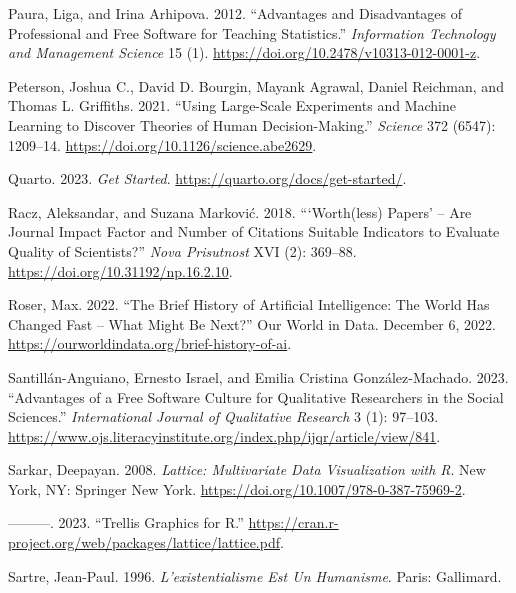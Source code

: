 \documentclass[
  letterpaper,
]{scrbook}
\newlength{\cslhangindent}
\newlength{\cslentryspacingunit} %
\newenvironment{CSLReferences}[2] %
 {%
  \setlength{\parindent}{0pt}
  \ifodd #1
  \let\oldpar\par
  \def\par{\hangindent=\cslhangindent\oldpar}
  \fi
  \setlength{\parskip}{#2\cslentryspacingunit}
 }%
 {}
\begin{document}
\begin{CSLReferences}{1}{0}
\leavevmode{}%
Paura, Liga, and Irina Arhipova. 2012. {``Advantages and {Disadvantages}
of {Professional} and {Free Software} for {Teaching Statistics}.''}
\emph{Information Technology and Management Science} 15 (1).
\url{https://doi.org/10.2478/v10313-012-0001-z}.

\leavevmode{}%
Peterson, Joshua C., David D. Bourgin, Mayank Agrawal, Daniel Reichman,
and Thomas L. Griffiths. 2021. {``Using {Large-Scale Experiments} and
{Machine Learning} to {Discover Theories} of {Human Decision-Making}.''}
\emph{Science} 372 (6547): 1209--14.
\url{https://doi.org/10.1126/science.abe2629}.

\leavevmode{}%
Quarto. 2023. \emph{Get {Started}}.
\url{https://quarto.org/docs/get-started/}.

\leavevmode{}%
Racz, Aleksandar, and Suzana Marković. 2018. {``{`{Worth}(less) Papers'}
-- Are Journal Impact Factor and Number of Citations Suitable Indicators
to Evaluate Quality of Scientists?''} \emph{Nova Prisutnost} XVI (2):
369--88. \url{https://doi.org/10.31192/np.16.2.10}.

\leavevmode{}%
Roser, Max. 2022. {``The {Brief History} of {Artificial Intelligence}:
{The World Has Changed Fast} -- {What Might Be Next}?''} Our World in
Data. December 6, 2022.
\url{https://ourworldindata.org/brief-history-of-ai}.

\leavevmode{}%
Santillán-Anguiano, Ernesto Israel, and Emilia Cristina
González-Machado. 2023. {``Advantages of a {Free Software Culture} for
{Qualitative Researchers} in the {Social Sciences}.''}
\emph{International Journal of Qualitative Research} 3 (1): 97--103.
\url{https://www.ojs.literacyinstitute.org/index.php/ijqr/article/view/841}.

\leavevmode{}%
Sarkar, Deepayan. 2008. \emph{Lattice: {Multivariate Data Visualization}
with {R}}. New York, NY: Springer New York.
\url{https://doi.org/10.1007/978-0-387-75969-2}.

\leavevmode{}%
---------. 2023. {``Trellis {Graphics} for {R}.''}
\url{https://cran.r-project.org/web/packages/lattice/lattice.pdf}.

\leavevmode{}%
Sartre, Jean-Paul. 1996. \emph{L'existentialisme Est Un Humanisme}.
Paris: Gallimard.


\end{CSLReferences}
\end{document}
